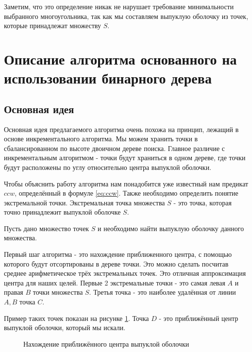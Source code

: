 Заметим, что это определение никак не нарушает требование минимальности выбранного многоугольника, так как мы составляем выпуклую оболочку из точек, которые принадлежат множеству $S$.

\section{Описание алгоритма основанного на использовании бинарного дерева} \label{sect2_2}

\subsection{Основная идея} \label{subsect2_2_1}

Основная идея предлагаемого алгоритма очень похожа на принцип, лежащий в основе инкрементального алгоритма. Мы можем хранить точки в сбалансированном по высоте двоичном дереве поиска. Главное различие с инкрементальным алгоритмом - точки будут храниться в одном дереве, где точки будут расположены по углу относительно центра выпуклой оболочки.

Чтобы объяснить работу алгоритма нам понадобится уже известный нам предикат $ccw$, определённый в формуле \ref{eq:ccw}. Также необходимо определить понятие экстремальной точки. Экстремальная точка множества $S$ - это точка, которая точно принадлежит выпуклой оболочке $S$.

Пусть дано множество точек $S$ и необходимо найти выпуклую оболочку данного множества.

Первый шаг алгоритма - это нахождение приближенного центра, с помощью которого будут отсортированы в дереве точки. Это можно сделать посчитав среднее арифметическое трёх экстремальных точек. Это отличная аппроксимация центра для наших целей. Первые 2 экстремальные точки -  это самая левая $A$ и правая $B$ точки множества $S$. Третья точка - это наиболее удалённая от линии $A, B$ точка $C$.

Пример таких точек показан на рисунке \ref{img:my_extreme_points}. Точка $D$ - это приближённый центр выпуклой оболочки, который мы искали.

\begin{figure}[H]
	{\centering
		\hfill
		\subbottom[\label{img:my_extreme_points_1}]{%
			}
		\hfill
		\subbottom[\label{img:my_extreme_points_2}]{%
			}
		\hfill
	}
	\caption{Нахождение приближённого центра выпуклой оболочки}
	\label{img:my_extreme_points}
\end{figure}

